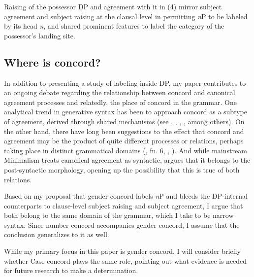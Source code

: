 \documentclass[output=paper
,modfonts
,nonflat]{langsci/langscibook}
\begin{document}
Raising of the possessor DP and agreement with it in (4) mirror subject agreement and subject raising at the clausal level in permitting \textit{n}P to be labeled by its head \textit{n}, and shared prominent features to label the category of the possessor's landing site. 

\subsection{Where is concord?} 
In addition to presenting a study of labeling inside DP, my paper contributes to an ongoing debate regarding the relationship between concord and canonical agreement processes and relatedly, the place of concord in the grammar. One analytical trend in generative syntax has been to approach concord as a subtype of agreement, derived through shared mechanisms (see \citealt{Baker2008}, \citealt{Carstens1991, Carstens2000, Carstens2011}, \citealt{Danon2011}, \citealt{Koopman2006}, \citealt{Toosarvandani_Van_Urk2014} among others). On the other hand, there have long been suggestions to the effect that concord and agreement may be the product of quite different processes or relations, perhaps taking place in distinct grammatical domains (\citealt{Baier2015}, \citealt{Chomsky2001} fn. 6, \citealt{Chung2013}, \citealt{Norris2014}). And while mainstream Minimalism treats canonical agreement as syntactic, \citet{Bobaljik2008} argues that it belongs to the post-syntactic morphology, opening up the possibility that this is true of both relations. 

Based on my proposal that gender concord labels \textit{n}P and bleeds the DP-internal counterparts to clause-level subject raising and subject agreement, I argue that both belong to the same domain of the grammar, which I take to be narrow syntax. Since number concord accompanies gender concord, I assume that the conclusion generalizes to it as well. 

While my primary focus in this paper is gender concord, I will consider briefly whether Case concord plays the same role, pointing out what evidence is needed for future research to make a determination.
\end{document}
